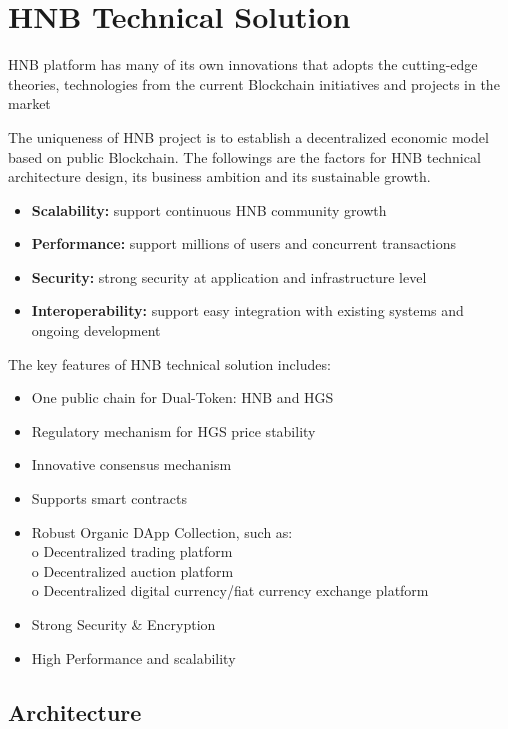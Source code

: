 \documentclass[fleqn,10pt]{SelfArx} %
\begin{document}

\section{HNB Technical Solution}

HNB platform has many of its own innovations that adopts the cutting-edge theories, technologies from the current Blockchain initiatives and projects in the market 

The uniqueness of HNB project is to establish a decentralized economic model based on public Blockchain. The followings are the factors for HNB technical architecture design, its business ambition and its sustainable growth.

\begin{itemize}
\item{\textbf {Scalability:} support continuous HNB community growth}
\item{\textbf {Performance:} support millions of users and concurrent transactions}
\item{\textbf {Security:} strong security at application and infrastructure level}
\item{\textbf {Interoperability:} support easy integration with existing systems and ongoing development}
\end{itemize}

The key features of HNB technical solution includes:
\begin{itemize}
\item{One public chain for Dual-Token: HNB and HGS}
\item{Regulatory mechanism for HGS price stability}
\item{Innovative consensus mechanism}
\item{Supports smart contracts}
\item{Robust Organic DApp Collection, such as:\\
o	Decentralized trading platform\\
o	Decentralized auction platform\\
o	Decentralized digital currency/fiat currency exchange platform
}
\item{Strong Security \& Encryption}
\item{High Performance and scalability}
\end{itemize}


\subsection{Architecture}
\end{document}
